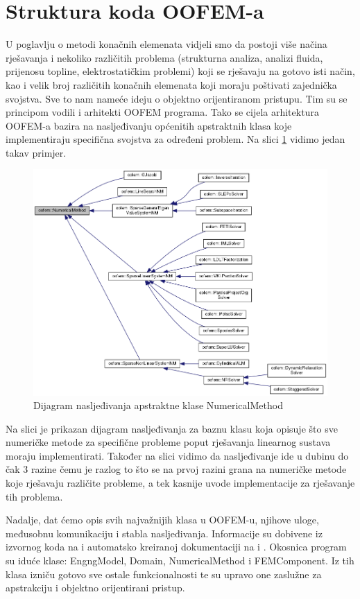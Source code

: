 \documentclass[a4paper,twoside,12pt]{memoir} %
\begin{document}
\section{Struktura koda OOFEM-a}
U poglavlju o metodi konačnih elemenata vidjeli smo da postoji više načina rješavanja i nekoliko različitih problema (strukturna analiza, analizi fluida, prijenosu topline, elektrostatičkim problemi) koji se rješavaju na gotovo isti način, kao i velik broj različitih konačnih elemenata koji moraju poštivati zajednička svojstva. Sve to nam nameće ideju o objektno orijentiranom pristupu. Tim su se principom vodili i arhitekti OOFEM programa. Tako se cijela arhitektura OOFEM-a bazira na nasljeđivanju općenitih apstraktnih klasa koje implementiraju specifična svojstva za određeni problem. Na slici \ref{fig:numerical_method_inheritance} vidimo jedan takav primjer.
\begin{figure}[h!t]
\begin{center}
\includegraphics[scale=0.46]{pictures/chapter_oofem/NumericalMethod_inheritance.png}
\caption{Dijagram nasljeđivanja apstraktne klase NumericalMethod \cite{oofem_reference}}
\label{fig:numerical_method_inheritance}
\end{center}
\end{figure}
Na slici je prikazan dijagram nasljeđivanja za baznu klasu koja opisuje što sve numeričke metode za specifične probleme poput rješavanja linearnog sustava moraju implementirati. Također na slici vidimo da nasljeđivanje ide u dubinu do čak 3 razine čemu je razlog to što se na prvoj razini grana na numeričke metode koje rješavaju različite probleme, a tek kasnije uvode implementacije za rješavanje tih problema. \par
Nadalje, dat ćemo opis svih najvažnijih klasa u OOFEM-u, njihove uloge, međusobnu komunikaciju i stabla nasljeđivanja. Informacije su dobivene iz izvornog koda na \cite{oofem_github} i automatsko kreiranoj dokumentaciji  na \cite{oofem_reference} i \cite{oofem_programmer}. Okosnica program su iduće klase: EngngModel, Domain, NumericalMethod i FEMComponent. Iz tih klasa izniču gotovo sve ostale funkcionalnosti te su upravo one zaslužne za apstrakciju i objektno orijentirani pristup. \par
\end{document}
